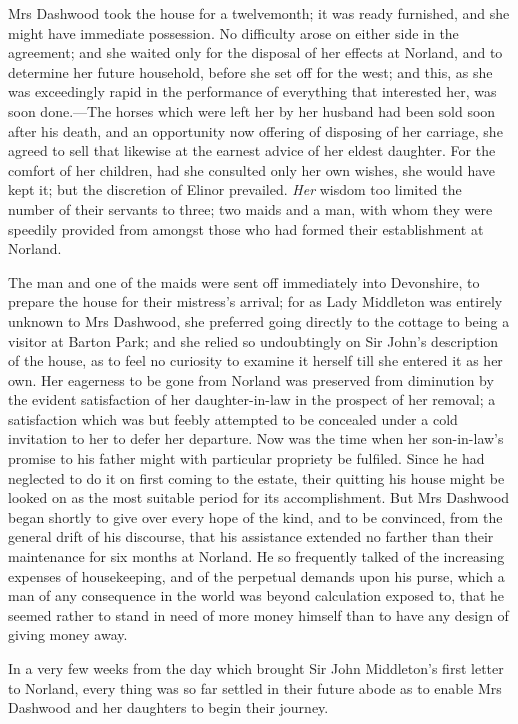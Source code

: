 Mrs Dashwood took the house for a twelvemonth; it was ready furnished, and she might have immediate possession. No difficulty arose on either side in the agreement; and she waited only for the disposal of her effects at Norland, and to determine her future household, before she set off for the west; and this, as she was exceedingly rapid in the performance of everything that interested her, was soon done.—The horses which were left her by her husband had been sold soon after his death, and an opportunity now offering of disposing of her carriage, she agreed to sell that likewise at the earnest advice of her eldest daughter. For the comfort of her children, had she consulted only her own wishes, she would have kept it; but the discretion of Elinor prevailed. \textit{Her} wisdom too limited the number of their servants to three; two maids and a man, with whom they were speedily provided from amongst those who had formed their establishment at Norland.

The man and one of the maids were sent off immediately into Devonshire, to prepare the house for their mistress’s arrival; for as Lady Middleton was entirely unknown to Mrs Dashwood, she preferred going directly to the cottage to being a visitor at Barton Park; and she relied so undoubtingly on Sir John’s description of the house, as to feel no curiosity to examine it herself till she entered it as her own. Her eagerness to be gone from Norland was preserved from diminution by the evident satisfaction of her daughter-in-law in the prospect of her removal; a satisfaction which was but feebly attempted to be concealed under a cold invitation to her to defer her departure. Now was the time when her son-in-law’s promise to his father might with particular propriety be fulfiled. Since he had neglected to do it on first coming to the estate, their quitting his house might be looked on as the most suitable period for its accomplishment. But Mrs Dashwood began shortly to give over every hope of the kind, and to be convinced, from the general drift of his discourse, that his assistance extended no farther than their maintenance for six months at Norland. He so frequently talked of the increasing expenses of housekeeping, and of the perpetual demands upon his purse, which a man of any consequence in the world was beyond calculation exposed to, that he seemed rather to stand in need of more money himself than to have any design of giving money away.

In a very few weeks from the day which brought Sir John Middleton’s first letter to Norland, every thing was so far settled in their future abode as to enable Mrs Dashwood and her daughters to begin their journey.

